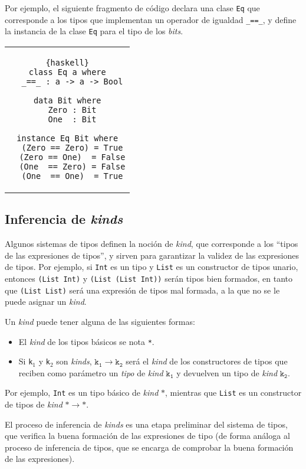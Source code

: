 Por ejemplo, el siguiente fragmento de código declara
una clase \verb|Eq| que corresponde a los tipos que implementan
un operador de igualdad \verb|_==_|,
y define la instancia de la clase \verb|Eq| para el tipo de los {\em bits}.
\begin{center}
\begin{tabular}{c}
\begin{lstlisting}{haskell}
class Eq a where
  _==_ : a -> a -> Bool

data Bit where
  Zero : Bit
  One  : Bit

instance Eq Bit where
  (Zero == Zero) = True
  (Zero == One)  = False
  (One  == Zero) = False
  (One  == One)  = True
\end{lstlisting}
\end{tabular}
\end{center}

\subsection{Inferencia de {\em kinds}}

Algunos sistemas de tipos definen la noción de {\em kind},
que corresponde a los ``tipos de las expresiones de tipos'',
y sirven para garantizar la validez de las expresiones de tipos.
Por ejemplo, si \texttt{Int} es un tipo y
\texttt{List} es un constructor de tipos unario,
entonces \texttt{(List Int)} y \texttt{(List (List Int))}
serán tipos bien formados, en tanto que \texttt{(List List)} será
una expresión de tipos mal formada, a la que no se le puede asignar
un {\em kind}.
\medskip

Un {\em kind} puede tener alguna de las siguientes formas:
\begin{itemize}
  \item El {\em kind} de los tipos básicos se nota \texttt{*}.
  \item Si \texttt{k$_1$} y \texttt{k$_2$} son {\em kinds},
        $\mathtt{k_1} \rightarrow \mathtt{k_2}$
        será el {\em kind} de los constructores de tipos
        que reciben como parámetro un {\em tipo} de {\em kind} $\mathtt{k_1}$
        y devuelven un tipo de {\em kind} $\mathtt{k_2}$.
\end{itemize}
Por ejemplo, \texttt{Int} es un tipo básico de {\em kind} $\mathtt{*}$,
mientras que \texttt{List} es un constructor de tipos de {\em kind} $\mathtt{*} \rightarrow \mathtt{*}$.

El proceso de inferencia de {\em kinds} es una etapa preliminar del sistema de tipos,
que verifica la buena formación de las expresiones de tipo
(de forma análoga al proceso de inferencia de tipos, que se encarga de comprobar
la buena formación de las expresiones).

